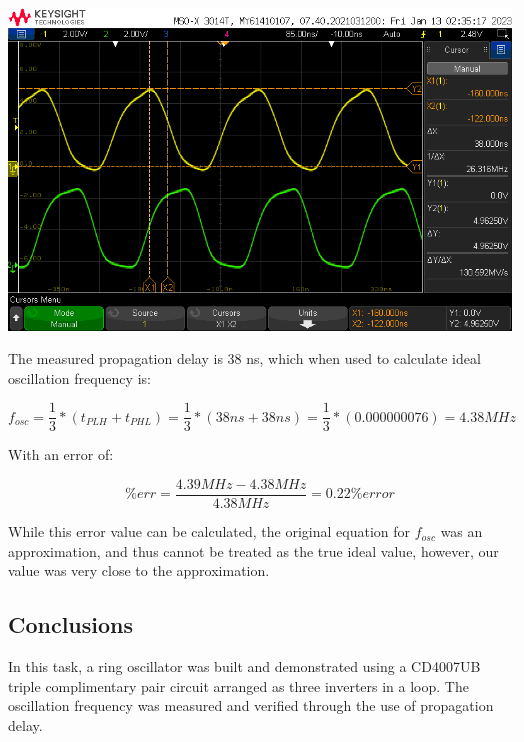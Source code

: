 \documentclass[notitlepage, 12pt]{report}  %
\begin{document}
\begin{center}
    \includegraphics[scale=0.5]{scope6.png}
\end{center}


The measured propagation delay is 38 ns, which when used to calculate ideal oscillation frequency is:

\begin{equation}
    f_{osc} = \frac{1}{3} * (t_{PLH} + t_{PHL}) = \frac{1}{3} * (38 ns + 38 ns) = \frac{1}{3} * (0.000000076) = 4.38 MHz
\end{equation}


With an error of:

\begin{equation}
    \% err = \frac{4.39 MHz - 4.38 MHz}{4.38 MHz} = 0.22\% error
\end{equation}

While this error value can be calculated, the original equation for $f_{osc}$ was an approximation, and thus cannot
be treated as the true ideal value, however, our value was very close to the approximation.



\subsection*{Conclusions}

\indent\indent In this task, a ring oscillator was built and demonstrated using a CD4007UB triple complimentary pair circuit arranged
as three inverters in a loop. The oscillation frequency was measured and verified through the use of propagation delay.



\end{document}
